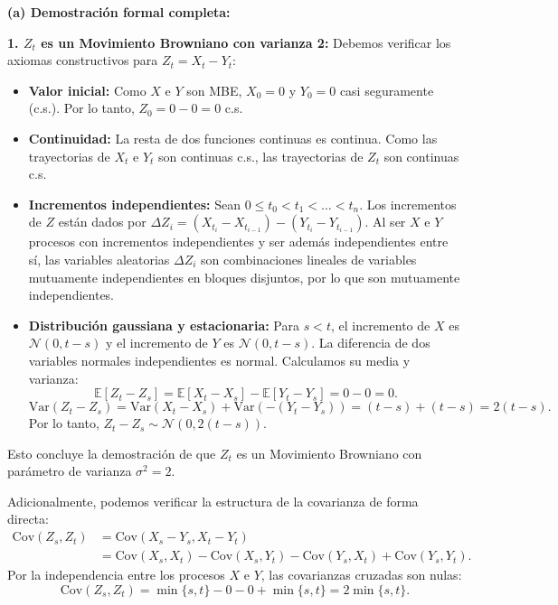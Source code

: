 \documentclass[11pt, letterpaper]{article}
\begin{document}
\begin{solucion}
    \vspace{3mm}
    \textbf{(a) Demostración formal completa:}

    \textbf{1. $Z_t$ es un Movimiento Browniano con varianza 2:}
    Debemos verificar los axiomas constructivos para $Z_t = X_t - Y_t$:
    \begin{itemize}
        \item \textbf{Valor inicial:} Como $X$ e $Y$ son MBE, $X_0 = 0$ y $Y_0 = 0$ casi seguramente (c.s.). Por lo tanto, $Z_0 = 0 - 0 = 0$ c.s.
        \item \textbf{Continuidad:} La resta de dos funciones continuas es continua. Como las trayectorias de $X_t$ e $Y_t$ son continuas c.s., las trayectorias de $Z_t$ son continuas c.s.
        \item \textbf{Incrementos independientes:} Sean $0 \le t_0 < t_1 < \dots < t_n$. Los incrementos de $Z$ están dados por $\Delta Z_i = (X_{t_i} - X_{t_{i-1}}) - (Y_{t_i} - Y_{t_{i-1}})$. Al ser $X$ e $Y$ procesos con incrementos independientes y ser además independientes entre sí, las variables aleatorias $\Delta Z_i$ son combinaciones lineales de variables mutuamente independientes en bloques disjuntos, por lo que son mutuamente independientes.
        \item \textbf{Distribución gaussiana y estacionaria:} Para $s < t$, el incremento de $X$ es $\mathcal{N}(0, t-s)$ y el incremento de $Y$ es $\mathcal{N}(0, t-s)$. La diferencia de dos variables normales independientes es normal. Calculamos su media y varianza:
        \[ \mathbb{E}[Z_t - Z_s] = \mathbb{E}[X_t - X_s] - \mathbb{E}[Y_t - Y_s] = 0 - 0 = 0. \]
        \[ \text{Var}(Z_t - Z_s) = \text{Var}(X_t - X_s) + \text{Var}(-(Y_t - Y_s)) = (t-s) + (t-s) = 2(t-s). \]
        Por lo tanto, $Z_t - Z_s \sim \mathcal{N}(0, 2(t-s))$.
    \end{itemize}
    Esto concluye la demostración de que $Z_t$ es un Movimiento Browniano con parámetro de varianza $\sigma^2 = 2$.
    
    Adicionalmente, podemos verificar la estructura de la covarianza de forma directa:
    \begin{align*}
        \text{Cov}(Z_s, Z_t) &= \text{Cov}(X_s - Y_s, X_t - Y_t) \\
        &= \text{Cov}(X_s, X_t) - \text{Cov}(X_s, Y_t) - \text{Cov}(Y_s, X_t) + \text{Cov}(Y_s, Y_t).
    \end{align*}
    Por la independencia entre los procesos $X$ e $Y$, las covarianzas cruzadas son nulas:
    \[ \text{Cov}(Z_s, Z_t) = \min\{s, t\} - 0 - 0 + \min\{s, t\} = 2\min\{s, t\}. \]


\end{solucion}
\end{document}
